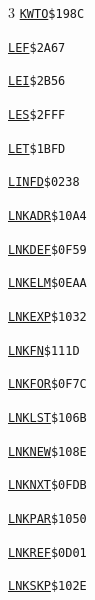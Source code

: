 \begin{multicols}{3}
\noindent\hyperlink{l:KWTO}{\texttt{KWTO}}\hfill\texttt{\$198C~\phantom{000}\llap{\pageref{l:KWTO}}}\par
\noindent\hyperlink{l:LEF}{\texttt{LEF}}\hfill\texttt{\$2A67~\phantom{000}\llap{\pageref{l:LEF}}}\par
\noindent\hyperlink{l:LEI}{\texttt{LEI}}\hfill\texttt{\$2B56~\phantom{000}\llap{\pageref{l:LEI}}}\par
\noindent\hyperlink{l:LES}{\texttt{LES}}\hfill\texttt{\$2FFF~\phantom{000}\llap{\pageref{l:LES}}}\par
\noindent\hyperlink{l:LET}{\texttt{LET}}\hfill\texttt{\$1BFD~\phantom{000}\llap{\pageref{l:LET}}}\par
\noindent\hyperlink{l:LINFD}{\texttt{LINFD}}\hfill\texttt{\$0238~\phantom{000}\llap{\pageref{l:LINFD}}}\par
\noindent\hyperlink{l:LNKADR}{\texttt{LNKADR}}\hfill\texttt{\$10A4~\phantom{000}\llap{\pageref{l:LNKADR}}}\par
\noindent\hyperlink{l:LNKDEF}{\texttt{LNKDEF}}\hfill\texttt{\$0F59~\phantom{000}\llap{\pageref{l:LNKDEF}}}\par
\noindent\hyperlink{l:LNKELM}{\texttt{LNKELM}}\hfill\texttt{\$0EAA~\phantom{000}\llap{\pageref{l:LNKELM}}}\par
\noindent\hyperlink{l:LNKEXP}{\texttt{LNKEXP}}\hfill\texttt{\$1032~\phantom{000}\llap{\pageref{l:LNKEXP}}}\par
\noindent\hyperlink{l:LNKFN}{\texttt{LNKFN}}\hfill\texttt{\$111D~\phantom{000}\llap{\pageref{l:LNKFN}}}\par
\noindent\hyperlink{l:LNKFOR}{\texttt{LNKFOR}}\hfill\texttt{\$0F7C~\phantom{000}\llap{\pageref{l:LNKFOR}}}\par
\noindent\hyperlink{l:LNKLST}{\texttt{LNKLST}}\hfill\texttt{\$106B~\phantom{000}\llap{\pageref{l:LNKLST}}}\par
\noindent\hyperlink{l:LNKNEW}{\texttt{LNKNEW}}\hfill\texttt{\$108E~\phantom{000}\llap{\pageref{l:LNKNEW}}}\par
\noindent\hyperlink{l:LNKNXT}{\texttt{LNKNXT}}\hfill\texttt{\$0FDB~\phantom{000}\llap{\pageref{l:LNKNXT}}}\par
\noindent\hyperlink{l:LNKPAR}{\texttt{LNKPAR}}\hfill\texttt{\$1050~\phantom{000}\llap{\pageref{l:LNKPAR}}}\par
\noindent\hyperlink{l:LNKREF}{\texttt{LNKREF}}\hfill\texttt{\$0D01~\phantom{000}\llap{\pageref{l:LNKREF}}}\par
\noindent\hyperlink{l:LNKSKP}{\texttt{LNKSKP}}\hfill\texttt{\$102E~\phantom{000}\llap{\pageref{l:LNKSKP}}}\par

\end{multicols}
